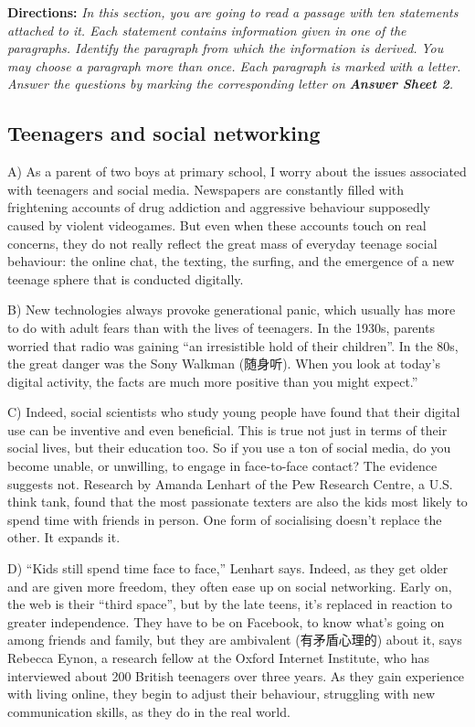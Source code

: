 \documentclass[UTF8,11pt]{ctexart}
\begin{document}
\textbf{Directions:} \textit{In this section, you are going to read a passage with ten statements attached to it. Each statement} \textit{contains information given in one of the paragraphs. Identify the paragraph from which the information is derived.} \textit{You may choose a paragraph more than once. Each paragraph is marked with a letter. Answer the questions by} \textit{marking the corresponding letter on }\textbf{\textit{Answer Sheet 2}}\textit{.}


\subsection*{\textbf{Teenagers and social networking}}


A) As a parent of two boys at primary school, I worry about the issues associated with teenagers and social media. Newspapers are constantly filled with frightening accounts of drug addiction and aggressive behaviour supposedly caused by violent videogames. But even when these accounts touch on real concerns, they do not really reflect the great mass of everyday teenage social behaviour: the online chat, the texting, the surfing, and the emergence of a new teenage sphere that is conducted digitally.


B) New technologies always provoke generational panic, which usually has more to do with adult fears than with the lives of teenagers. In the 1930s, parents worried that radio was gaining “an irresistible hold of their children”. In the 80s, the great danger was the Sony Walkman (随身听). When you look at today’s digital activity, the facts are much more positive than you might expect.”


C) Indeed, social scientists who study young people have found that their digital use can be inventive and even beneficial. This is true not just in terms of their social lives, but their education too. So if you use a ton of social media, do you become unable, or unwilling, to engage in face-to-face contact? The evidence suggests not. Research by Amanda Lenhart of the Pew Research Centre, a U.S. think tank, found that the most passionate texters are also the kids most likely to spend time with friends in person. One form of socialising doesn’t replace the other. It expands it.


D) “Kids still spend time face to face,” Lenhart says. Indeed, as they get older and are given more freedom, they often ease up on social networking. Early on, the web is their “third space”, but by the late teens, it’s replaced in reaction to greater independence. They have to be on Facebook, to know what’s going on among friends and family, but they are ambivalent (有矛盾心理的) about it, says Rebecca Eynon, a research fellow at the Oxford Internet Institute, who has interviewed about 200 British teenagers over three years. As they gain experience with living online, they begin to adjust their behaviour, struggling with new communication skills, as they do in the real world.
\end{document}
